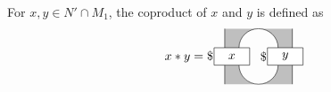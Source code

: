 \documentclass[11pt,letterpaper]{amsart}
\theoremstyle{definition}
\theoremstyle{remark}
\begin{document}
For $x,y \in N' \cap M_1$, the coproduct of $x$ and $y$ is defined as
\begin{equation*}
\begin{tikzpicture}
\path [fill=lightgray] (.3,1.05)--(2.2,1.05)--(2.2,.5)--(1.8,.5) arc[radius=.55,start angle=0, end angle=180]--(.3,.5);
\path [fill=lightgray] (.3,-.55)--(2.2,-.55)--(2.2,0)--(1.8,0) arc[radius=.55,start angle=0, end angle=-180]--(.3,0);
\draw (.3,-.55)--(.3,1.05);
\draw (2.2,-.55)--(2.2,1.05);
\draw (.7,0) arc [radius=.55, start angle=180, end angle =360];
\draw (.7,.5) arc [radius=.55, start angle=180, end angle =0];
\draw [fill=white] (0,0) rectangle (1,.5);
\draw [fill=white] (1.5,0) rectangle (2.5,.5);
\node at (.5,.25) {$x$};
\node at (2,.25) {$y$};
\node at (0.1,.25) [left]{$x*y=\$$};
\node at (1.6,.25) [left]{$\$$};
\end{tikzpicture}
\end{equation*}
\end{document}

